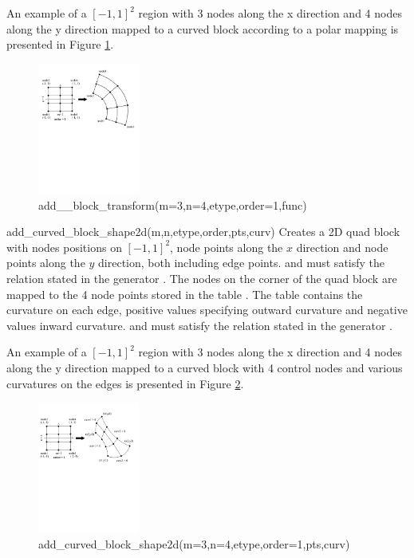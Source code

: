 \begin{codelist}
    An example of a $[-1,1]^2$ region with 3 nodes along the x direction and
    4 nodes along the y direction mapped to a curved block according to a 
    polar mapping is presented in Figure \ref{fig:AddBlockTransform}.
    \begin{figure}[htbp]
    \centering
    \includegraphics[trim=0.0in 5.5in 0.0in 0.5in, clip, height=1.7in]{fig/block_transform.pdf}
    \caption{add\_\_block\_transform(m=3,n=4,etype,order=1,func)}
    \label{fig:AddBlockTransform}
    \end{figure}

  \item[add\_curved\_block\_shape2d(m,n,etype,order,pts,curv)]
    Creates a 2D quad block with nodes positions on $[-1,1]^2$, 
     node points along the $x$ direction and  node
    points along the $y$ direction, both including edge points. 
     and  must satisfy the relation stated in
    the generator . The nodes on the corner of the 
    quad block are mapped to the 4 node points stored in the table
    . The table 
     contains the curvature
    on each edge, positive values specifying outward curvature and 
    negative values inward curvature.
     and  must satisfy the relation stated in the 
    generator . 

    An example of a $[-1,1]^2$ region with 3 nodes along the x direction and
    4 nodes along the y direction mapped to a curved block with 4 control
    nodes and various curvatures on the edges is presented in 
    Figure \ref{fig:AddCurvedBlockShape2D}.
    \begin{figure}[htbp]
    \centering
    \includegraphics[trim=0.0in 5.5in 0.0in 0.5in, clip, height=1.7in]{fig/block_curved_block.pdf}
    \caption{add\_curved\_block\_shape2d(m=3,n=4,etype,order=1,pts,curv)}
    \label{fig:AddCurvedBlockShape2D}
    \end{figure}
\end{codelist}

